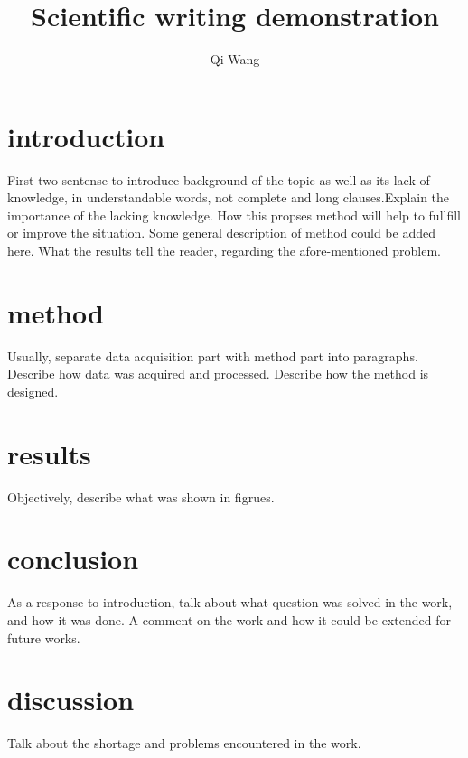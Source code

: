 \documentclass{article}
\title{Scientific writing demonstration}
\author{Qi Wang}
\begin{document}
    \maketitle
    \section*{introduction}
    First two sentense to introduce background of the topic as well as its lack of knowledge, in understandable words, not complete and long clauses.Explain the importance of the lacking knowledge. How this propses method will help to fullfill or improve the situation. Some general description of method could be added here. What the results tell the reader, regarding the afore-mentioned problem.
    \section*{method}
    Usually, separate data acquisition part with method part into paragraphs.
    Describe how data was acquired and processed. 
    Describe how the method is designed.
    \section*{results}
    Objectively, describe what was shown in figrues. 
    \section*{conclusion}
    As a response to introduction, talk about what question was solved in the work, and how it was done. A comment on the work and how it could be extended for future works.
    \section*{discussion}
    Talk about the shortage and problems encountered in the work. 
\end{document}

